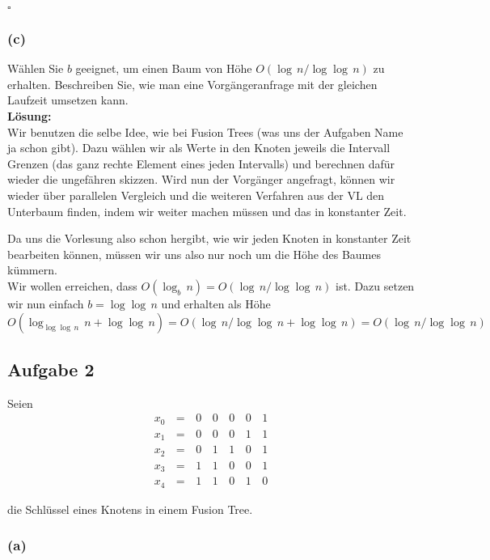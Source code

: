 \documentclass[11pt,a4paper,ngerman]{article}
\begin{document}
\mbox{}\hfill$\square$

\subsubsection*{(c)}

Wählen Sie $b$ geeignet, um einen Baum von Höhe $O(\log \, n / \log \log \, n)$ zu erhalten. Beschreiben Sie, wie man eine Vorgängeranfrage mit der gleichen Laufzeit umsetzen kann.\\

\noindent\textbf{Lösung:}\\

Wir benutzen die selbe Idee, wie bei Fusion Trees (was uns der Aufgaben Name ja schon gibt). Dazu wählen wir als Werte in den Knoten jeweils die Intervall Grenzen (das ganz rechte Element eines jeden Intervalls) und berechnen dafür wieder die ungefähren skizzen. Wird nun der Vorgänger angefragt, können wir wieder über parallelen Vergleich und
die weiteren Verfahren aus der VL den Unterbaum finden, indem wir weiter machen müssen
und das in konstanter Zeit.

Da uns die Vorlesung also schon hergibt, wie wir jeden Knoten in konstanter Zeit bearbeiten können, müssen wir uns also nur noch um die Höhe des Baumes kümmern.\\

Wir wollen erreichen, dass $O(\log_b \, n) = O(\log \, n / \log \log \, n)$ ist.
Dazu setzen wir nun einfach $b = \log \log \, n$ und erhalten als Höhe
$$
   O(\log_{\log\log \, n} \, n + \log \log \, n) = O(\log \, n / \log \log \, n + \log \log \,n) = O(\log \, n / \log \log \, n)
$$

\subsection*{Aufgabe 2}
Seien
$$
\begin{array}{ccccccc}
   x_0 \, &= \,& 0 \, & 0 \, & 0 \, & 0 \,& 1\\
   x_1 &=& 0 & 0 & 0 & 1 & 1\\
   x_2 &=& 0 & 1 & 1 & 0 & 1\\
   x_3 &=& 1 & 1 & 0 & 0 & 1\\
   x_4 &=& 1 & 1 & 0 & 1 & 0
\end{array}
$$

die Schlüssel eines Knotens in einem Fusion Tree.

\subsubsection*{(a)}
\end{document}
